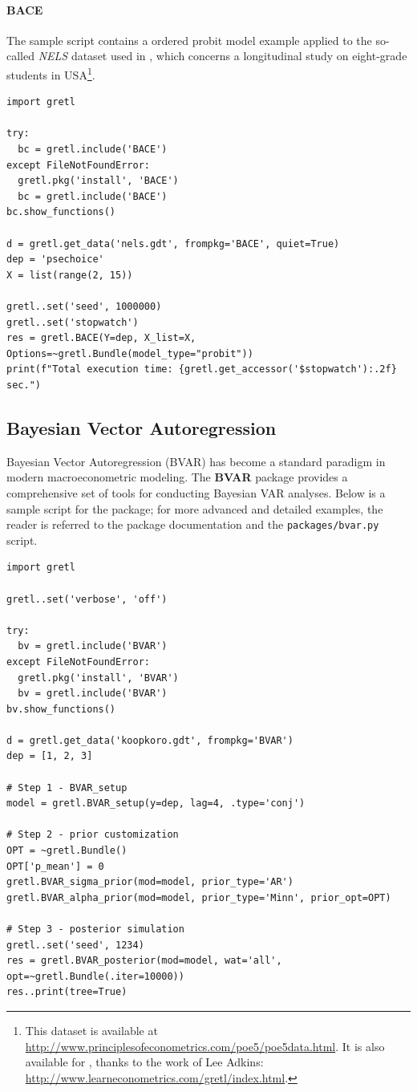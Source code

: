 \paragraph{BACE} The sample script contains a ordered
probit model example applied to the so-called \textit{NELS}
dataset used in \cite{HillGriffithsLim_principles_2017},
which concerns a longitudinal study on eight-grade students
in USA\footnote{This dataset is available at
	\url{http://www.principlesofeconometrics.com/poe5/poe5data.html}.
	It is also available for \gretl, thanks to the work of Lee Adkins:
	\url{http://www.learneconometrics.com/gretl/index.html}.}.
\begin{lstlisting}[style=pythonstylefoot]
import gretl

try:
  bc = gretl.include('BACE')
except FileNotFoundError:
  gretl.pkg('install', 'BACE')
  bc = gretl.include('BACE')
bc.show_functions()

d = gretl.get_data('nels.gdt', frompkg='BACE', quiet=True)
dep = 'psechoice'
X = list(range(2, 15))

gretl..set('seed', 1000000)
gretl..set('stopwatch')
res = gretl.BACE(Y=dep, X_list=X, Options=~gretl.Bundle(model_type="probit"))
print(f"Total execution time: {gretl.get_accessor('$stopwatch'):.2f} sec.")
\end{lstlisting}%


\subsection{Bayesian Vector Autoregression}\label{sec.bvar}
Bayesian Vector Autoregression (BVAR) has become a standard
paradigm in modern macroeconometric modeling. The \gretl
\textbf{BVAR} package \cite[see][]{BVAR_in_gretl_CS}
provides a comprehensive set of tools for conducting Bayesian
VAR analyses. Below is a sample script for the package; for
more advanced and detailed examples, the reader is referred
to the package documentation and the \texttt{packages/bvar.py} script.
\begin{lstlisting}[style=pythonstylefoot]
import gretl

gretl..set('verbose', 'off')

try:
  bv = gretl.include('BVAR')
except FileNotFoundError:
  gretl.pkg('install', 'BVAR')
  bv = gretl.include('BVAR')
bv.show_functions()

d = gretl.get_data('koopkoro.gdt', frompkg='BVAR')
dep = [1, 2, 3]

# Step 1 - BVAR_setup
model = gretl.BVAR_setup(y=dep, lag=4, .type='conj')

# Step 2 - prior customization
OPT = ~gretl.Bundle()
OPT['p_mean'] = 0
gretl.BVAR_sigma_prior(mod=model, prior_type='AR')
gretl.BVAR_alpha_prior(mod=model, prior_type='Minn', prior_opt=OPT)

# Step 3 - posterior simulation
gretl..set('seed', 1234)
res = gretl.BVAR_posterior(mod=model, wat='all', opt=~gretl.Bundle(.iter=10000))
res..print(tree=True)
\end{lstlisting}%
